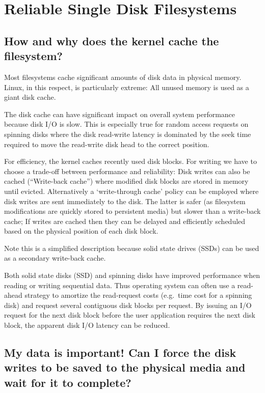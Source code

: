 \section{Reliable Single Disk
Filesystems}\label{reliable-single-disk-filesystems}

\subsection{How and why does the kernel cache the
filesystem?}\label{how-and-why-does-the-kernel-cache-the-filesystem}

Most filesystems cache significant amounts of disk data in physical
memory. Linux, in this respect, is particularly extreme: All unused
memory is used as a giant disk cache.

The disk cache can have significant impact on overall system performance
because disk I/O is slow. This is especially true for random access
requests on spinning disks where the disk read-write latency is
dominated by the seek time required to move the read-write disk head to
the correct position.

For efficiency, the kernel caches recently used disk blocks. For writing
we have to choose a trade-off between performance and reliability: Disk
writes can also be cached (``Write-back cache'') where modified disk
blocks are stored in memory until evicted. Alternatively a
`write-through cache' policy can be employed where disk writes are sent
immediately to the disk. The latter is safer (as filesystem
modifications are quickly stored to persistent media) but slower than a
write-back cache; If writes are cached then they can be delayed and
efficiently scheduled based on the physical position of each disk block.

Note this is a simplified description because solid state drives (SSDs)
can be used as a secondary write-back cache.

Both solid state disks (SSD) and spinning disks have improved
performance when reading or writing sequential data. Thus operating
system can often use a read-ahead strategy to amortize the read-request
costs (e.g.~time cost for a spinning disk) and request several
contiguous disk blocks per request. By issuing an I/O request for the
next disk block before the user application requires the next disk
block, the apparent disk I/O latency can be reduced.

\subsection{My data is important! Can I force the disk writes to be
saved to the physical media and wait for it to
complete?}\label{my-data-is-important-can-i-force-the-disk-writes-to-be-saved-to-the-physical-media-and-wait-for-it-to-complete}

